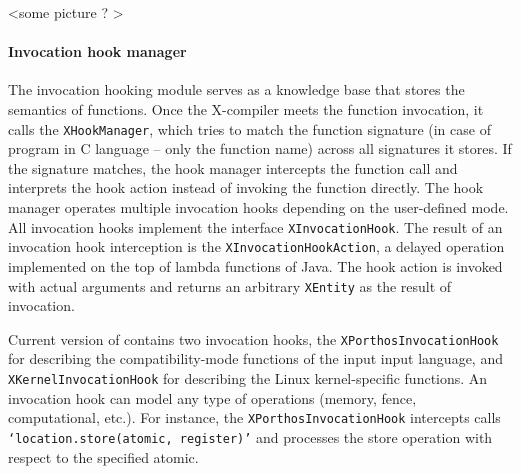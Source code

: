 <some picture ? >


\paragraph{Invocation hook manager}
\label{ch:impl:proc:x-compiler:hooking}



The invocation hooking module serves as a knowledge base that stores the semantics of functions.
Once the X-compiler meets the function invocation, it calls the \texttt{XHookManager}, which tries to match the function signature (in case of program in C language -- only the function name) across all signatures it stores.
If the signature matches, the hook manager intercepts the function call and interprets the hook action instead of invoking the function directly.
The hook manager operates multiple invocation hooks depending on the user-defined mode.
All invocation hooks implement the interface \texttt{XInvocationHook}.
The result of an invocation hook interception is the \texttt{XInvocationHookAction}, a delayed operation implemented on the top of lambda functions of Java.
The hook action is invoked with actual arguments and returns an arbitrary \texttt{XEntity} as the result of invocation.

Current version of \porthos[2] contains two invocation hooks, the \texttt{XPorthosInvocationHook} for describing the compatibility-mode functions of the input \porthos[2] input language, and \texttt{XKernelInvocationHook} for describing the Linux kernel-specific functions.
An invocation hook can model any type of operations (memory, fence, computational, etc.).
For instance, the \texttt{XPorthosInvocationHook} intercepts calls \texttt{`location.store(atomic, register)'} and processes the store operation with respect to the specified atomic.




